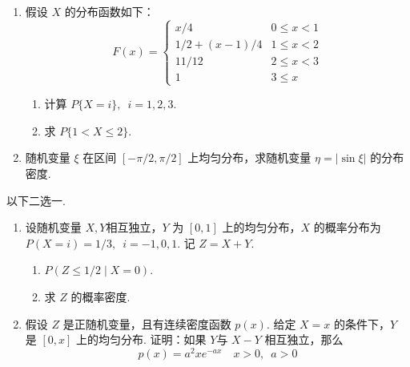 \documentclass{ctexart}
\begin{document}
\begin{enumerate}
    \item 假设 $ X $ 的分布函数如下：
    \[ F(x) = \begin{cases}
        x / 4 & 0 \leqslant x < 1 \\
        1 / 2 + (x - 1) / 4 & 1 \leqslant x < 2 \\
        11/12 & 2 \leqslant x < 3 \\
        1 & 3 \leqslant x
    \end{cases} \]
    \begin{enumerate}
        \item 计算 $ P\{ X = i \},\enspace i = 1,2,3 $.

        \item 求 $ P\{ 1 < X \leqslant 2 \} $.
    \end{enumerate}

    \item 随机变量 $ \xi $ 在区间 $ [-\pi/2, \pi/2] $ 上均匀分布，求随机变量 $ \eta = \lvert \sin\xi \rvert $ 的分布密度.
\end{enumerate}

以下二选一.

\begin{enumerate}[resume]
    \item 设随机变量 $ X,Y $相互独立，$ Y $ 为 $ [0,1] $ 上的均匀分布，$ X $ 的概率分布为 $ P(X=i) = 1/3, \allowbreak\enspace i = -1, 0, 1 $. 记 $ Z = X + Y $.
    \begin{enumerate}
        \item $ P(Z \leqslant 1/2 \mid X = 0) $.

        \item 求 $ Z $ 的概率密度.
    \end{enumerate}

    \item 假设 $ Z $ 是正随机变量，且有连续密度函数 $ p(x) $. 给定 $ X = x $ 的条件下，$ Y $ 是 $ [0, x] $ 上的均匀分布. 证明：如果 $ Y $与 $ X-Y $ 相互独立，那么
    \[ p(x) = a^2 x e^{-ax} \quad x > 0,\enspace a > 0 \]
\end{enumerate}
\end{document}
